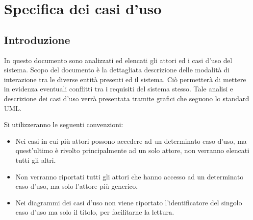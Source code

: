 \chapter{Specifica dei casi d'uso}

\section{Introduzione}
In questo documento sono analizzati ed elencati gli attori ed i casi d'uso del sistema.
Scopo del documento è la dettagliata descrizione delle modalità di interazione tra le diverse entità presenti ed il sistema.
Ciò permetterà di mettere in evidenza eventuali conflitti tra i requisiti del sistema stesso.
Tale analisi e descrizione dei casi d'uso verrà presentata tramite grafici che seguono lo standard UML.

\noindent
Si utilizzeranno le seguenti convenzioni:
\begin{itemize}
	\item Nei casi in cui più attori possono accedere ad un determinato caso d’uso, ma quest'ultimo è rivolto principalmente ad un solo attore, non verranno elencati tutti gli altri.

	\item Non verranno riportati tutti gli attori che hanno accesso ad un determinato caso d'uso, ma solo l'attore più generico.
	
	\item Nei diagrammi dei casi d'uso non viene riportato l'identificatore del singolo caso d'uso ma solo il titolo, per facilitarne la lettura.
\end{itemize}

